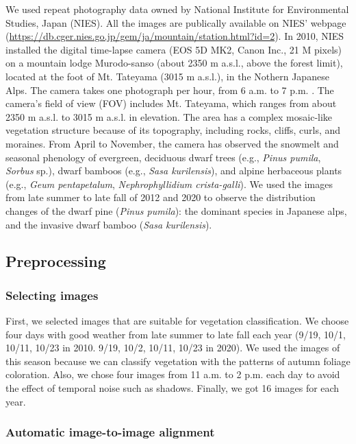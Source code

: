 \documentclass{article}
\begin{document}
We used repeat photography data owned by National Institute for Environmental Studies, Japan (NIES). All the images are publically available on NIES' webpage (\url{https://db.cger.nies.go.jp/gem/ja/mountain/station.html?id=2}). In 2010, NIES installed the digital time-lapse camera (EOS 5D MK2, Canon Inc., 21 M pixels) on a mountain lodge Murodo-sanso (about 2350 m a.s.l., above the forest limit), located at the foot of Mt. Tateyama (3015 m a.s.l.), in the Nothern Japanese Alps. The camera takes one photograph per hour, from 6 a.m. to 7 p.m. . The camera's field of view (FOV) includes Mt. Tateyama, which ranges from about 2350 m a.s.l. to 3015 m a.s.l. in elevation. The area has a complex mosaic-like vegetation structure because of its topography, including rocks, cliffs, curls, and moraines. From April to November, the camera has observed the snowmelt and seasonal phenology of evergreen, deciduous dwarf trees (e.g., \emph{Pinus pumila}, \emph{Sorbus} sp.), dwarf bamboos (e.g., \emph{Sasa kurilensis}), and alpine herbaceous plants (e.g., \emph{Geum pentapetalum}, \emph{Nephrophyllidium crista-galli}). We used the images from late summer to late fall of 2012 and 2020 to observe the distribution changes of the dwarf pine (\emph{Pinus pumila}): the dominant species in Japanese alps, and the invasive dwarf bamboo (\emph{Sasa kurilensis}).

\hypertarget{preprocessing}{%
\subsection{Preprocessing}\label{preprocessing}}

\hypertarget{selecting-images}{%
\subsubsection{Selecting images}\label{selecting-images}}

First, we selected images that are suitable for vegetation classification. We choose four days with good weather from late summer to late fall each year (9/19, 10/1, 10/11, 10/23 in 2010. 9/19, 10/2, 10/11, 10/23 in 2020). We used the images of this season because we can classify vegetation with the patterns of autumn foliage coloration. Also, we chose four images from 11 a.m. to 2 p.m. each day to avoid the effect of temporal noise such as shadows. Finally, we got 16 images for each year.

\hypertarget{automatic-image-to-image-alignment}{%
\subsubsection{Automatic image-to-image alignment}\label{automatic-image-to-image-alignment}}
\end{document}
